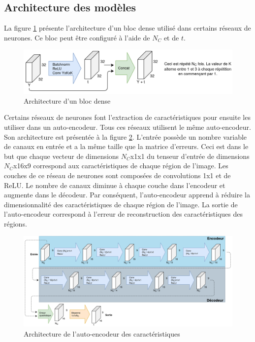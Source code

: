 \subsection{Architecture des modèles}
    La figure \ref{fig:architecture_bloc_dense} présente l'architecture d'un bloc dense utilisé dans certains réseaux de neurones. Ce bloc peut être configuré à l'aide de \(N_C\) et de \(t\). 
    \begin{figure}[H]
        \centering
        \includegraphics[width=15cm]{images/Architecture_DenseBlock.png}
        \caption{Architecture d'un bloc dense}
        \label{fig:architecture_bloc_dense}
    \end{figure}

    Certains réseaux de neurones font l'extraction de caractéristiques pour ensuite les utiliser dans un auto-encodeur. Tous ces réseaux utilisent le même auto-encodeur. Son architecture est présentée à la figure  \ref{fig:architecture_autoencoder_caracteristique}. L'entrée possède un nombre variable de canaux en entrée et a la même taille que la matrice d'erreurs. Ceci est dans le but que chaque vecteur de dimensions \(N_C\)x1x1 du tenseur d'entrée de dimensions \(N_C\)x16x9 correspond aux caractéristiques de chaque région de l'image. Les couches de ce réseau de neurones sont composées de convolutions 1x1 et de ReLU. Le nombre de canaux diminue à chaque couche dans l'encodeur et augmente dans le décodeur. Par conséquent, l'auto-encodeur apprend à réduire la dimensionnalité des caractéristiques de chaque région de l'image. La sortie de l'auto-encodeur correspond à l'erreur de reconstruction des caractéristiques des régions.
    \begin{figure}[H]
        \centering
        \includegraphics[width=17cm]{images/Architecture_FeatureAutoencoder.png}
        \caption{Architecture de l'auto-encodeur des caractéristiques}
        \label{fig:architecture_autoencoder_caracteristique}
    \end{figure}

